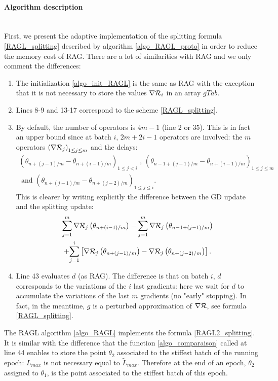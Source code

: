 \paragraph{Algorithm description}
~~\\
First, we present the adaptive implementation of the splitting formula \eqref{RAGL_splitting} described by algorithm \ref{algo_RAGL_proto} in order to reduce the memory cost of RAG. There are a lot of similarities with RAG and we only comment the differences:
\begin{enumerate}
	\item The initialization \ref{algo_init_RAGL} is the same as RAG with the exception that it is not necessary to store the values $\nabla \mathcal{R}_i$ in an array $gTab$.
	\item Lines 8-9 and 13-17 correspond to the scheme \eqref{RAGL_splitting}.
	\item By default, the number of operators is $4m-1$ (line 2 or 35). This is in fact an upper bound since at batch $i$, $2m+2i-1$ operators are involved: the $m$ operators $\left(\nabla \mathcal{R}_j\right)_{1\leq j \leq m}$ and the delays:
	\begin{multline*}
		\left(\theta_{n+(j-1)/m}-\theta_{n+(i-1)/m}\right)_{1\leq j<i} \text{ , } \left(\theta_{n-1+(j-1)/m}-\theta_{n+(i-1)/m}\right)_{1\leq j \leq m} \\ 
		\text{ and } \left(\theta_{n+(j-1)/m}-\theta_{n+(j-2)/m}\right)_{1\leq j \leq i}.
	\end{multline*}
	This is clearer by writing explicitly the difference between the GD update and the splitting update:
	\begin{multline*}
		\sum_{j=1}^m \nabla \mathcal{R}_j\left(\theta_{n+(i-1)/m}\right) - \sum_{j=1}^m \nabla \mathcal{R}_j\left(\theta_{n-1+(j-1)/m}\right) \\
		 + \displaystyle{\sum_{j=1}^i} \left[\nabla \mathcal{R}_j\left(\theta_{n+(j-1)/m}\right)-\nabla \mathcal{R}_j\left(\theta_{n+(j-2)/m}\right)\right]. 
	\end{multline*}
	\item Line 43 evaluates $d$ (as RAG). The difference is that on batch $i$, $d$ corresponds to the variations of the $i$ last gradients: here we wait for $d$ to accumulate the variations of the last $m$ gradients (no "early" stopping). In fact, in the meantime, $g$ is a perturbed approximation of $\nabla \mathcal{R}$, see formula \eqref{RAGL_splitting}.
\end{enumerate}
The RAGL algorithm \ref{algo_RAGL} implements the formula \eqref{RAGL2_splitting}. It is similar with the difference that the function \eqref{algo_comparaison} called at line 44 enables to store the point $\theta_2$ associated to the stiffest batch of the running epoch: $L_{max}$ is not necessary equal to $\tilde{L}_{max}$. Therefore at the end of an epoch, $\theta_2$ assigned to $\theta_1$, is the point associated to the stiffest batch of this epoch. \\

